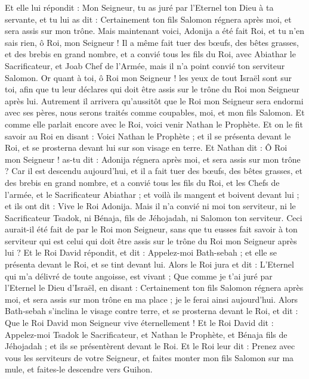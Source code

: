 \begin{multicols}{2}
Et elle lui répondit : Mon Seigneur, tu as juré par l'Eternel ton Dieu à ta servante, et tu lui as dit : Certainement ton fils Salomon régnera après moi, et sera assis sur mon trône.
Mais maintenant voici, Adonija a été fait Roi, et tu n'en sais rien, ô Roi, mon Seigneur !
Il a même fait tuer des bœufs, des bêtes grasses, et des brebis en grand nombre, et a convié tous les fils du Roi, avec Abiathar le Sacrificateur, et Joab Chef de l'Armée, mais il n'a point convié ton serviteur Salomon.
Or quant à toi, ô Roi mon Seigneur ! les yeux de tout Israël sont sur toi, afin que tu leur déclares qui doit être assis sur le trône du Roi mon Seigneur après lui.
Autrement il arrivera qu'aussitôt que le Roi mon Seigneur sera endormi avec ses pères, nous serons traités comme coupables, moi, et mon fils Salomon.
Et comme elle parlait encore avec le Roi, voici venir Nathan le Prophète.
Et on le fit savoir au Roi en disant : Voici Nathan le Prophète ; et il se présenta devant le Roi, et se prosterna devant lui sur son visage en terre.
Et Nathan dit : Ô Roi mon Seigneur ! as-tu dit : Adonija régnera après moi, et sera assis sur mon trône ?
Car il est descendu aujourd'hui, et il a fait tuer des bœufs, des bêtes grasses, et des brebis en grand nombre, et a convié tous les fils du Roi, et les Chefs de l'armée, et le Sacrificateur Abiathar ; et voilà ils mangent et boivent devant lui ; et ils ont dit : Vive le Roi Adonija.
Mais il n'a convié ni moi ton serviteur, ni le Sacrificateur Tsadok, ni Bénaja, fils de Jéhojadah, ni Salomon ton serviteur.
Ceci aurait-il été fait de par le Roi mon Seigneur, sans que tu eusses fait savoir à ton serviteur qui est celui qui doit être assis sur le trône du Roi mon Seigneur après lui ?
Et le Roi David répondit, et dit : Appelez-moi Bath-sebah ; et elle se présenta devant le Roi, et se tint devant lui.
Alors le Roi jura et dit : L'Eternel qui m'a délivré de toute angoisse, est vivant ;
Que comme je t'ai juré par l'Eternel le Dieu d'Israël, en disant : Certainement ton fils Salomon régnera après moi, et sera assis sur mon trône en ma place ; je le ferai ainsi aujourd'hui.
Alors Bath-sebah s'inclina le visage contre terre, et se prosterna devant le Roi, et dit : Que le Roi David mon Seigneur vive éternellement !
Et le Roi David dit : Appelez-moi Tsadok le Sacrificateur, et Nathan le Prophète, et Bénaja fils de Jéhojadah ; et ils se présentèrent devant le Roi.
Et le Roi leur dit : Prenez avec vous les serviteurs de votre Seigneur, et faites monter mon fils Salomon sur ma mule, et faites-le descendre vers Guihon.

\end{multicols}

